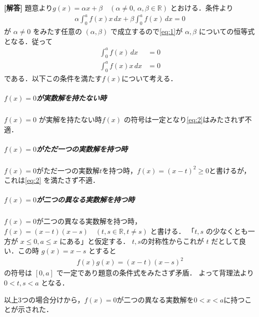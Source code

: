 \documentclass[../../main.tex]{subfiles}
\begin{document}
\begin{oframed}
  
\end{oframed}

{\bf [解答]}
題意より$g(x) = \alpha x + \beta \quad (\alpha \ne 0, \, \alpha, \beta \in \mathbb{R})$ とおける．条件より
\begin{align}
  \alpha \int_0^a f(x) x \, dx + \beta \int_0^a f(x) \, dx = 0 \label{eq:1}
\end{align}
が $\alpha \ne 0$ をみたす任意の $(\alpha, \beta)$ で成立するので\cref{eq:1}が $\alpha, \beta$ についての恒等式となる．従って
\begin{align}
  \int_0^a f(x) \, dx &= 0 \label{eq:2} \\
  \int_0^a f(x) x \, dx &= 0 \label{eq:3}
\end{align}
である．以下この条件を満たす$f(x)$について考える．

\subparagraph{$f(x)=0$が実数解を持たない時}

$f(x) = 0$ が実解を持たない時$f(x)$ の符号は一定となり\cref{eq:2}はみたされず不適．

\subparagraph{$f(x)=0$がただ一つの実数解を持つ時}

$f(x)=0$がただ一つの実数解$t$を持つ時，$f(x) = (x-t)^2 \ge 0$と書けるが，これは\cref{eq:2} を満たさず不適．

\subparagraph{$f(x)=0$が二つの異なる実数解を持つ時}

$f(x)=0$が二つの異なる実数解を持つ時，$f(x) = (x-t)(x-s) \quad (t, s \in \mathbb{R}, t\neq s)$ と書ける．
「$t, s$ の少なくとも一方が $x \le 0, a \le x$ にある」と仮定する．
$t,s$の対称性からこれが $t$ だとして良い．この時 $g(x) = x - s$ とすると
\begin{align}
  f(x)g(x) = (x-t)(x-s)^2
\end{align}
の符号は $[0, a]$ で一定であり題意の条件式をみたさず矛盾．
よって背理法より $0 < t, s < a$ となる．
\casesend

以上3つの場合分けから，$f(x)=0$が二つの異なる実数解を$0<x<a$に持つことが示された．
\end{document}
